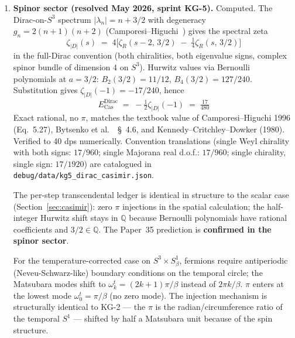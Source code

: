 \documentclass[11pt]{article}
\begin{document}
\begin{enumerate}
\setlength\itemsep{0pt}

\item \textbf{Spinor sector (resolved May 2026, sprint KG-5).}
Computed.  The Dirac-on-$S^3$ spectrum
$|\lambda_n| = n + 3/2$ with degeneracy $g_n = 2(n+1)(n+2)$
(Camporesi--Higuchi~\cite{camporesi_higuchi}) gives the spectral zeta
\[
\zeta_{|D|}(s) \;=\; 4\bigl[\zeta_R(s{-}2,\, 3/2) \;-\; \tfrac{1}{4}\zeta_R(s,\, 3/2)\bigr]
\]
in the full-Dirac convention (both chiralities, both eigenvalue signs,
complex spinor bundle of dimension $4$ on $S^3$).  Hurwitz values via
Bernoulli polynomials at $a = 3/2$: $B_2(3/2) = 11/12$,
$B_4(3/2) = 127/240$.  Substitution gives $\zeta_{|D|}(-1) = -17/240$,
hence
\begin{equation}
\boxed{E^{\text{Dirac}}_\text{Cas} \;=\; -\tfrac{1}{2}\zeta_{|D|}(-1) \;=\; \tfrac{17}{480}}
\end{equation}
Exact rational, no $\pi$, matches the textbook value of
Camporesi--Higuchi 1996 (Eq.~5.27),
Bytsenko et al.~\cite{bytsenko}~\S~4.6, and
Kennedy--Critchley--Dowker (1980).  Verified to 40 dps numerically.
Convention translations (single Weyl chirality with both signs:
$17/960$; single Majorana real d.o.f.: $17/960$; single chirality,
single sign: $17/1920$) are catalogued in
\texttt{debug/data/kg5\_dirac\_casimir.json}.

The per-step transcendental ledger is identical in structure to the
scalar case (Section~\ref{sec:casimir}): zero $\pi$ injections in
the spatial calculation; the half-integer Hurwitz shift stays in
$\mathbb{Q}$ because Bernoulli polynomials have rational coefficients
and $3/2 \in \mathbb{Q}$.  The Paper~35 prediction is
\textbf{confirmed in the spinor sector}.

For the temperature-corrected case on $S^3 \times S^1_\beta$, fermions
require antiperiodic (Neveu-Schwarz-like) boundary conditions on the
temporal circle; the Matsubara modes shift to
$\omega^t_k = (2k+1)\pi/\beta$ instead of $2\pi k/\beta$.  $\pi$
enters at the lowest mode $\omega^t_0 = \pi/\beta$ (no zero mode).
The injection mechanism is structurally identical to KG-2 --- the
$\pi$ is the radian/circumference ratio of the temporal $S^1$ ---
shifted by half a Matsubara unit because of the spin structure.


\end{enumerate}
\end{document}
